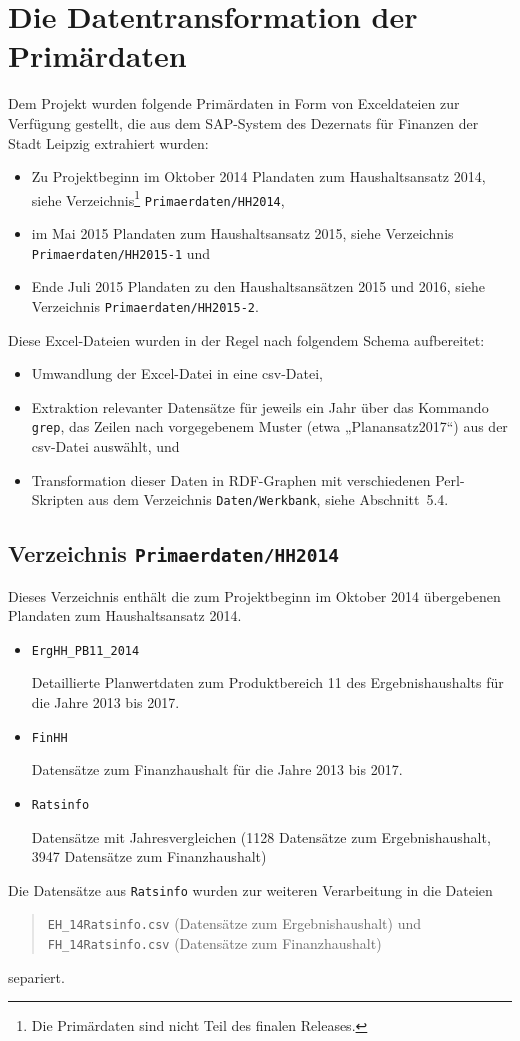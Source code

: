 \documentclass[a4paper,11pt,twoside]{article}
\begin{document}
\section{Die Datentransformation der Primärdaten}

Dem Projekt wurden folgende Primärdaten in Form von Exceldateien zur Verfügung
gestellt, die aus dem SAP-System des Dezernats für Finanzen der Stadt Leipzig
extrahiert wurden:
\begin{itemize}\raggedright
\item Zu Projektbeginn im Oktober 2014 Plandaten zum Haushaltsansatz 2014,
  siehe Verzeichnis\footnote{Die Primärdaten sind nicht Teil des finalen
    Releases.} \texttt{Primaerdaten/HH2014},
\item im Mai 2015 Plandaten zum Haushaltsansatz 2015, siehe Verzeichnis
  \texttt{Primaerdaten/HH2015-1} und
\item Ende Juli 2015 Plandaten zu den Haushaltsansätzen 2015 und 2016, siehe
  Verzeichnis \texttt{Primaerdaten/HH2015-2}.
\end{itemize}
Diese Excel-Dateien wurden in der Regel nach folgendem Schema aufbereitet:
\begin{itemize}
\item Umwandlung der Excel-Datei in eine csv-Datei,
\item Extraktion relevanter Datensätze für jeweils ein Jahr über das Kommando
  \texttt{grep}, das Zeilen nach vorgegebenem Muster (etwa „Planansatz2017“)
  aus der csv-Datei auswählt, und
\item Transformation dieser Daten in RDF-Graphen mit verschiedenen
  Perl-Skripten aus dem Verzeichnis \texttt{Daten/Werkbank}, siehe
  Abschnitt~5.4.
\end{itemize}

\subsection{Verzeichnis \texttt{Primaerdaten/HH2014}}
Dieses Verzeichnis enthält die zum Projektbeginn im Oktober 2014 übergebenen
Plandaten zum Haushaltsansatz 2014.
\begin{itemize}
\item \texttt{ErgHH\_PB11\_2014}

Detaillierte Planwertdaten zum Produktbereich 11 des Ergebnishaushalts für die
Jahre 2013 bis 2017. 

\item \texttt{FinHH} 

Datensätze zum Finanzhaushalt für die Jahre 2013 bis 2017.

\item \texttt{Ratsinfo} 

Datensätze mit Jahresvergleichen (1128 Datensätze zum Ergebnishaushalt, 3947
Datensätze zum Finanzhaushalt)
\end{itemize}
Die Datensätze aus \texttt{Ratsinfo} wurden zur weiteren Verarbeitung in
die Dateien 
\begin{quote}
  \texttt{EH\_14Ratsinfo.csv} (Datensätze zum Ergebnishaushalt) und\\
  \texttt{FH\_14Ratsinfo.csv} (Datensätze zum Finanzhaushalt)
\end{quote}
separiert. 
\end{document}
